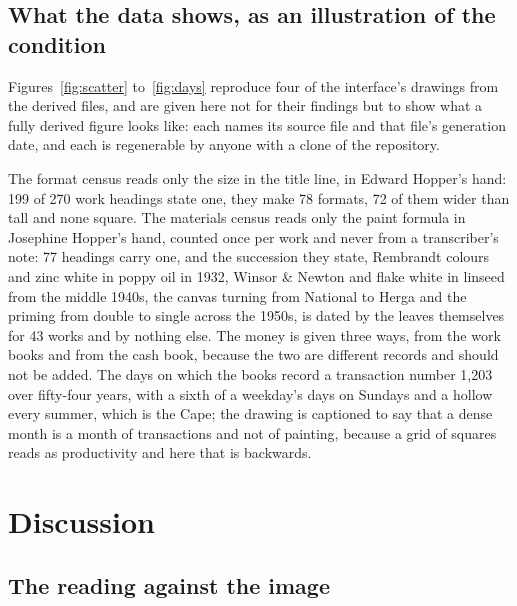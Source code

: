 \documentclass[11pt]{article}
\begin{document}
\subsection{What the data shows, as an illustration of the condition}

Figures~\ref{fig:scatter} to~\ref{fig:days} reproduce four of the interface's drawings from the derived files, and are given here not for their findings but to show what a fully derived figure looks like: each names its source file and that file's generation date, and each is regenerable by anyone with a clone of the repository.






The format census reads only the size in the title line, in Edward Hopper's hand: 199 of 270 work headings state one, they make 78 formats, 72 of them wider than tall and none square. The materials census reads only the paint formula in Josephine Hopper's hand, counted once per work and never from a transcriber's note: 77 headings carry one, and the succession they state, Rembrandt colours and zinc white in poppy oil in 1932, Winsor \& Newton and flake white in linseed from the middle 1940s, the canvas turning from National to Herga and the priming from double to single across the 1950s, is dated by the leaves themselves for 43 works and by nothing else. The money is given three ways, from the work books and from the cash book, because the two are different records and should not be added. The days on which the books record a transaction number 1,203 over fifty-four years, with a sixth of a weekday's days on Sundays and a hollow every summer, which is the Cape; the drawing is captioned to say that a dense month is a month of transactions and not of painting, because a grid of squares reads as productivity and here that is backwards.

\section{Discussion}

\subsection{The reading against the image}
\end{document}
